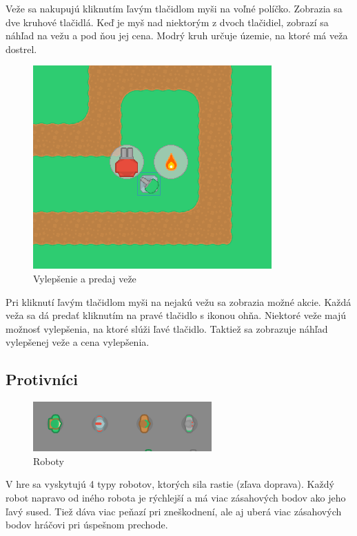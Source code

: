 \documentclass[12pt]{article}
\begin{document}
Veže sa nakupujú kliknutím ľavým tlačidlom myši na voľné políčko. Zobrazia sa dve 
kruhové tlačidlá. Keď je myš nad niektorým z dvoch tlačidiel, zobrazí sa náhľad
na vežu a pod ňou jej cena. Modrý kruh určuje územie, na ktoré má veža dostrel.

\begin{figure}[h]
    \centering
    \includegraphics{images/upgrade.png}
    \caption{Vylepšenie a predaj veže}
\end{figure}

Pri kliknutí ľavým tlačidlom myši na nejakú vežu sa zobrazia možné akcie. Každá veža sa
dá predať kliknutím na pravé tlačidlo s ikonou ohňa. Niektoré veže majú možnosť vylepšenia,
na ktoré slúži ľavé tlačidlo. Taktiež sa zobrazuje náhľad vylepšenej veže a cena vylepšenia.

\subsection{Protivníci}

\begin{figure}[h]
    \centering
    \includegraphics{images/oponenti.png}
    \caption{Roboty}
\end{figure}

V hre sa vyskytujú 4 typy robotov, ktorých sila rastie (zľava doprava). Každý robot napravo
od iného robota je rýchlejší a má viac zásahových bodov ako jeho ľavý sused. Tiež 
dáva viac peňazí pri zneškodnení, ale aj uberá viac zásahových bodov hráčovi pri úspešnom prechode.
\end{document}
